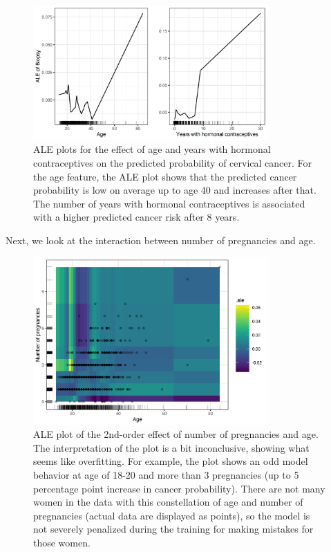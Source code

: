 \documentclass[
  11pt,
]{scrbook}
\begin{document}
\begin{figure}

{\centering \includegraphics[width=0.8\textwidth]{images/ale-cervical-1D-1} 

}

\caption{ALE plots for the effect of age and years with hormonal contraceptives on the predicted probability of cervical cancer. For the age feature, the ALE plot shows that the predicted cancer probability is low on average up to age 40 and increases after that. The number of years with hormonal contraceptives is associated with a higher predicted cancer risk after 8 years.}\label{fig:ale-cervical-1D}
\end{figure}

Next, we look at the interaction between number of pregnancies and age.

\begin{figure}

{\centering \includegraphics[width=0.8\textwidth]{images/ale-cervical-2d-1} 

}

\caption{ALE plot of the 2nd-order effect of number of pregnancies and age. The interpretation of the plot is a bit inconclusive, showing what seems like overfitting. For example, the plot shows an odd model behavior at age of 18-20 and more than 3 pregnancies (up to 5 percentage point increase in cancer probability). There are not many women in the data with this constellation of age and number of pregnancies (actual data are displayed as points), so the model is not severely penalized during the training for making mistakes for those women.}\label{fig:ale-cervical-2d}
\end{figure}
\end{document}
